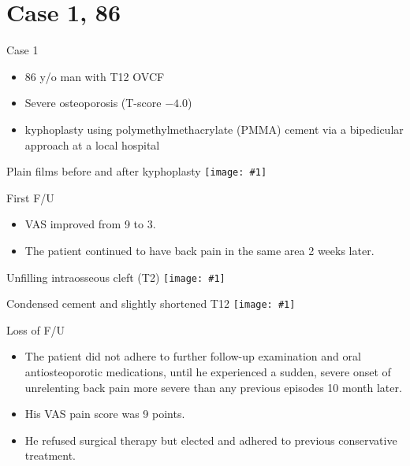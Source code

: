 \documentclass{beamer}
\newcommand*{\solo}[1]{\centering\texttt{[image: \#1]}}
\begin{document}
\section{Case 1, 86 \male}
\begin{frame}{Case 1}
    \begin{itemize}
        \item 86 y/o man with T12 OVCF
        \item Severe osteoporosis (T-score $-4.0$)
        \item kyphoplasty using polymethylmethacrylate (PMMA) cement via a
              bipedicular approach at a local hospital
    \end{itemize}
\end{frame}

\begin{frame}{Plain films before and after kyphoplasty}
    \solo{F1a.jpg}
\end{frame}

\begin{frame}{First F/U}
    \begin{itemize}
        \item VAS improved from 9 to 3.
        \item The patient continued to have back pain in the same area 2 weeks later.
    \end{itemize}
\end{frame}

\begin{frame}{Unfilling intraosseous cleft (T2)}
    \solo{F1c.jpg}
\end{frame}

\begin{frame}{Condensed cement and slightly shortened T12}
    \solo{F1d.jpg}
\end{frame}

\begin{frame}{Loss of F/U}
    \begin{itemize}
        \item The patient did not adhere to further follow-up examination and
              oral antiosteoporotic medications, until he experienced a sudden,
              severe onset of unrelenting back pain more severe than any
              previous episodes 10 month later.
        \item His VAS pain score was 9 points.
        \item He refused surgical therapy but elected and adhered to previous
              conservative treatment.
    \end{itemize}
\end{frame}
\end{document}
